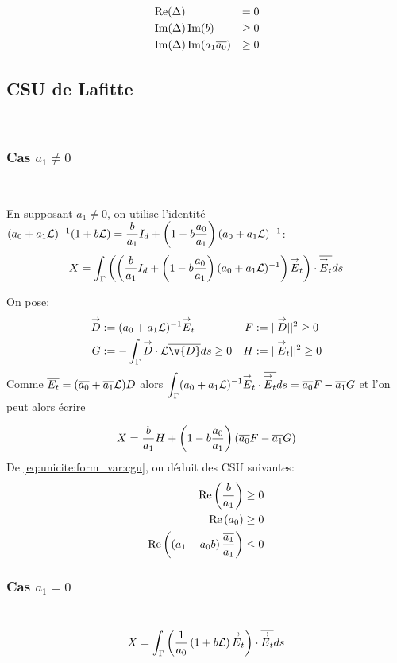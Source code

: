       \begin{align}
        &\operatorname{Re}(\Delta) &= 0\\
        &\operatorname{Im}(\Delta)\operatorname{Im}(b) &\ge 0\\
        &\operatorname{Im}(\Delta)\operatorname{Im}(a_1{\overline{a_0}})&\ge 0
      \end{align}

    \subsection{CSU de Lafitte}
      ~
      \subsubsection{Cas \(a_1\not=0\)}
        ~

        En supposant \(a_1 \not=0\), on utilise l'identité \((a_0 + a_1 \mathcal{L})^{-1}(1 + b \mathcal{L})  = \dfrac{b}{a_1} I_d + \left(1-b\dfrac{a_0}{a_1}\right)(a_0+a_1 \mathcal{L})^{-1}\):
        \[
          X = \int_\Gamma \left(\left(\dfrac{b}{a_1} I_d + \left(1-b\dfrac{a_0}{a_1}\right)(a_0+a_1 \mathcal{L})^{-1}\right){\overset{\rightarrow}{E}}_t\right) \cdot {\overline{{\overset{\rightarrow}{E}}_t}} ds
        \]

        On pose:
        \begin{align*}
          \vect D &:= (a_0 + a_1 \LL)^{-1}\vE_t & F&:= || \vect D || ^2 \ge 0  \\
          G&:= -\int_\Gamma \vect D \cdot \LL\conj{\v{D}} ds \ge 0 & H &:= || \vE_t || ^2 \ge 0
        \end{align*}
        Comme \({\overline{E_t}} = ({\overline{a_0}} + {\overline{a_1}}\mathcal{L})D\) alors \(\displaystyle\int_\Gamma (a_0 +a_1 \mathcal{L}) ^{-1}{\overset{\rightarrow}{E}}_t\cdot {\overline{{\overset{\rightarrow}{E}}_t}} ds = {\overline{a_0}} F - {\overline{a_1}} G\) et l'on peut alors écrire

        \begin{equation}
          \label{eq:unicite:form_var:decomp_cgu_ci1_a1}
          X = \dfrac{b}{a_1}H   + \left(1-b\dfrac{a_0}{a_1}\right)\left({\overline{a_0}} F - {\overline{a_1}} G\right)
        \end{equation}
        De \eqref{eq:unicite:form_var:cgu}, on déduit des CSU suivantes:
        \begin{align}
          \operatorname{Re}\left(\dfrac{b}{a_1}\right) \ge 0 \\
          \operatorname{Re}\left(a_0\right) \ge 0 \\
          \operatorname{Re}\left(\left(a_1-a_0 b\right)\dfrac{{\overline{a_1}}}{a_1}\right) \le 0
        \end{align}

      \subsubsection{Cas \(a_1=0\)}
        ~
        \[
          X = \int_\Gamma \left( \dfrac{1}{a_0}\left(1+b\mathcal{L}\right){\overset{\rightarrow}{E}}_t\right) \cdot {\overline{{\overset{\rightarrow}{E}}_t}} ds
        \]

